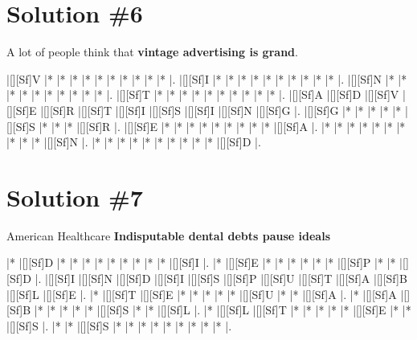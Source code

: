 \documentclass[letterpaper]{article}
\begin{document}
\newpage
\section*{Solution \#6}
A lot of people think that \textbf{vintage advertising is grand}.

\vspace*{1em}
\begin{Puzzle}{11}{9}
|[][Sf]V  |*        |*        |*        |*        |*        |*        |*        |*        |*        |*        |. 
|[][Sf]I  |*        |*        |*        |*        |*        |*        |*        |*        |*        |*        |.  
|[][Sf]N  |*        |*        |*        |*        |*        |*        |*        |*        |*        |*        |.
|[][Sf]T  |*        |*        |*        |*        |*        |*        |*        |*        |*        |*        |.  
|[][Sf]A  |[][Sf]D  |[][Sf]V  |[][Sf]E  |[][Sf]R  |[][Sf]T  |[][Sf]I  |[][Sf]S  |[][Sf]I  |[][Sf]N  |[][Sf]G  |.
|[][Sf]G  |*        |*        |*        |*        |*        |[][Sf]S  |*        |*        |*        |[][Sf]R  |. 
|[][Sf]E  |*        |*        |*        |*        |*        |*        |*        |*        |*        |[][Sf]A  |.
|*        |*        |*        |*        |*        |*        |*        |*        |*        |*        |[][Sf]N  |.
|*        |*        |*        |*        |*        |*        |*        |*        |*        |*        |[][Sf]D  |.
\end{Puzzle}

\newpage
\section*{Solution \#7}
American Healthcare
\newline\textbf{Indisputable dental debts pause ideals}

\vspace*{1em}
\begin{Puzzle}{12}{7}
|*        |[][Sf]D  |*        |*        |*        |*        |*        |*        |*        |*        |*        |[][Sf]I  |.
|*        |[][Sf]E  |*        |*        |*        |*        |*        |*        |[][Sf]P  |*        |*        |[][Sf]D  |.  
|[][Sf]I  |[][Sf]N  |[][Sf]D  |[][Sf]I  |[][Sf]S  |[][Sf]P  |[][Sf]U  |[][Sf]T  |[][Sf]A  |[][Sf]B  |[][Sf]L  |[][Sf]E  |.
|*        |[][Sf]T  |[][Sf]E  |*        |*        |*        |*        |*        |[][Sf]U  |*        |*        |[][Sf]A  |. 
|*        |[][Sf]A  |[][Sf]B  |*        |*        |*        |*        |*        |[][Sf]S  |*        |*        |[][Sf]L  |.
|*        |[][Sf]L  |[][Sf]T  |*        |*        |*        |*        |*        |[][Sf]E  |*        |*        |[][Sf]S  |.
|*        |*        |[][Sf]S  |*        |*        |*        |*        |*        |*        |*        |*        |*        |.
\end{Puzzle}
\end{document}
